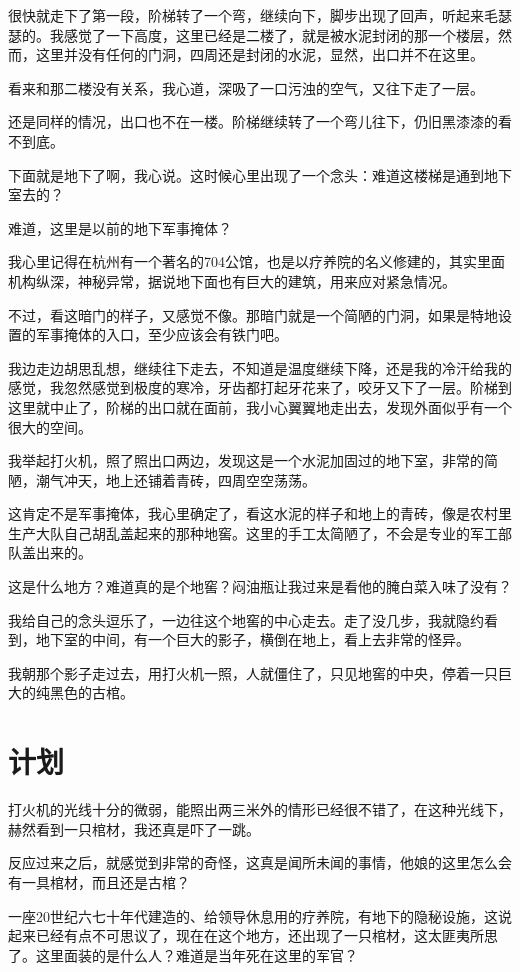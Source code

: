 很快就走下了第一段，阶梯转了一个弯，继续向下，脚步出现了回声，听起来毛瑟瑟的。我感觉了一下高度，这里已经是二楼了，就是被水泥封闭的那一个楼层，然而，这里并没有任何的门洞，四周还是封闭的水泥，显然，出口并不在这里。

看来和那二楼没有关系，我心道，深吸了一口污浊的空气，又往下走了一层。

还是同样的情况，出口也不在一楼。阶梯继续转了一个弯儿往下，仍旧黑漆漆的看不到底。

下面就是地下了啊，我心说。这时候心里出现了一个念头：难道这楼梯是通到地下室去的？

难道，这里是以前的地下军事掩体？

我心里记得在杭州有一个著名的704公馆，也是以疗养院的名义修建的，其实里面机构纵深，神秘异常，据说地下面也有巨大的建筑，用来应对紧急情况。

不过，看这暗门的样子，又感觉不像。那暗门就是一个简陋的门洞，如果是特地设置的军事掩体的入口，至少应该会有铁门吧。

我边走边胡思乱想，继续往下走去，不知道是温度继续下降，还是我的冷汗给我的感觉，我忽然感觉到极度的寒冷，牙齿都打起牙花来了，咬牙又下了一层。阶梯到这里就中止了，阶梯的出口就在面前，我小心翼翼地走出去，发现外面似乎有一个很大的空间。

我举起打火机，照了照出口两边，发现这是一个水泥加固过的地下室，非常的简陋，潮气冲天，地上还铺着青砖，四周空空荡荡。

这肯定不是军事掩体，我心里确定了，看这水泥的样子和地上的青砖，像是农村里生产大队自己胡乱盖起来的那种地窖。这里的手工太简陋了，不会是专业的军工部队盖出来的。

这是什么地方？难道真的是个地窖？闷油瓶让我过来是看他的腌白菜入味了没有？

我给自己的念头逗乐了，一边往这个地窖的中心走去。走了没几步，我就隐约看到，地下室的中间，有一个巨大的影子，横倒在地上，看上去非常的怪异。

我朝那个影子走过去，用打火机一照，人就僵住了，只见地窖的中央，停着一只巨大的纯黑色的古棺。

\chapter{计划}

打火机的光线十分的微弱，能照出两三米外的情形已经很不错了，在这种光线下，赫然看到一只棺材，我还真是吓了一跳。

反应过来之后，就感觉到非常的奇怪，这真是闻所未闻的事情，他娘的这里怎么会有一具棺材，而且还是古棺？

一座20世纪六七十年代建造的、给领导休息用的疗养院，有地下的隐秘设施，这说起来已经有点不可思议了，现在在这个地方，还出现了一只棺材，这太匪夷所思了。这里面装的是什么人？难道是当年死在这里的军官？

